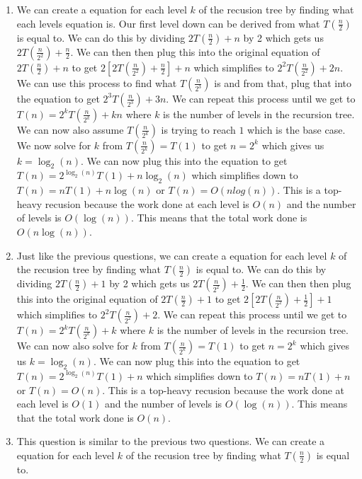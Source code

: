 \documentclass[12pt,letterpaper]{article}
\begin{document}
\begin{enumerate}
    \item We can create a equation for each level $k$ of the recusion tree by finding what each levels equation is. Our first level down 
    can be derived from what $T(\frac{n}{2})$ is equal to.
    We can do this by dividing $2T(\frac{n}{2})+n$ by 2 which gets us $2T(\frac{n}{2^2})+\frac{n}{2}$. We can then
    then plug this into the original equation of $2T(\frac{n}{2})+n$ to get $2[2T(\frac{n}{2^2}) + \frac{n}{2}] + n$ which
    simplifies to $2^2T(\frac{n}{2^2}) + 2n$. We can use this process to find what $T(\frac{n}{2^3})$ is and from that, plug that
    into the equation to get $2^3T(\frac{n}{2^3}) + 3n$. We can repeat this process until we get to $T(n) = 2^kT(\frac{n}{2^k}) + kn$
    where $k$ is the number of levels in the recursion tree. We can now also assume $T(\frac{n}{2^k})$ is trying to reach $1$ which is the base case.
    We now solve for $k$ from $T(\frac{n}{2^k}) = T(1)$ to get 
    $n = 2^k$ which gives us $k = \log_2(n)$. We can now plug this into the equation to get $T(n) = 2^{\log_2(n)}T(1) + n\log_2(n)$ which
    simplifies down to $T(n) = nT(1) + n\log(n)$ or $T(n) = O(nlog(n))$. This is a top-heavy recusion because the work done at each
    level is $O(n)$ and the number of levels is $O(\log(n))$. This means that the total work done is $O(n\log(n))$.
    \item Just like the previous questions, we can create a equation for each level $k$ of the recusion tree by finding what $T(\frac{n}{2})$ is equal to.
    We can do this by dividing $2T(\frac{n}{2})+1$ by 2 which gets us $2T(\frac{n}{2^2})+\frac{1}{2}$. We can then
    then plug this into the original equation of $2T(\frac{n}{2})+1$ to get $2[2T(\frac{n}{2^2}) + \frac{1}{2}] + 1$ which
    simplifies to $2^2T(\frac{n}{2^2}) + 2$. We can repeat this process until we get to $T(n) = 2^kT(\frac{n}{2^k}) + k$
    where $k$ is the number of levels in the recursion tree. We can now also solve for $k$ from $T(\frac{n}{2^k}) = T(1)$ to get
    $n = 2^k$ which gives us $k = \log_2(n)$. We can now plug this into the equation to get $T(n) = 2^{\log_2(n)}T(1) + n$ which
    simplifies down to $T(n) = nT(1) + n$ or $T(n) = O(n)$. This is a top-heavy recusion because the work done at each
    level is $O(1)$ and the number of levels is $O(\log(n))$. This means that the total work done is $O(n)$.
    \item This question is similar to the previous two questions. We can create a equation for each level $k$ of the recusion tree by finding what $T(\frac{n}{2})$ is equal to.

\end{enumerate}
\end{document}
